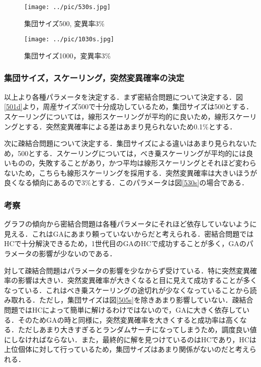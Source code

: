 \documentclass[a4j]{jarticle}
\begin{document}
\begin{figure}[H]
 \begin{minipage}{0.5\hsize}
  \begin{center}
   \texttt{[image: ../pic/530s.jpg]}
  \end{center}
  \caption{集団サイズ500, 変異率3\%}
  \label{530s}
 \end{minipage}
 \begin{minipage}{0.5\hsize}
  \begin{center}
   \texttt{[image: ../pic/1030s.jpg]}
  \end{center}
  \caption{集団サイズ1000，変異率3\%}
  \label{1030s}
 \end{minipage}
\end{figure}


\subsubsection{集団サイズ，スケーリング，突然変異確率の決定}
以上より各種パラメータを決定する．まず密結合問題について決定する．図\ref{501d}より，周産サイズ500で十分成功しているため，集団サイズは500とする．スケーリングについては，線形スケーリングが平均的に良いため，線形スケーリングとする．突然変異確率による差はあまり見られないため0.1\%とする．\par
次に疎結合問題について決定する．集団サイズによる違いはあまり見られないため，500とする．スケーリングについては，べき乗スケーリングが平均的には良いものの，失敗することがあり，かつ平均は線形スケーリングとそれほど変わらないため，こちらも線形スケーリングを採用する．突然変異確率は大きいほうが良くなる傾向にあるので3\%とする．このパラメータは図\ref{530s}の場合である．

\subsubsection{考察}
グラフの傾向から密結合問題は各種パラメータにそれほど依存していないように見える．これはGAにあまり頼っていないからだと考えられる．密結合問題ではHCで十分解決できるため，1世代目のGAのHCで成功することが多く，GAのパラメータの影響が少ないのである．\par
対して疎結合問題はパラメータの影響を少なからず受けている．特に突然変異確率の影響は大きい．突然変異確率が大きくなると目に見えて成功することが多くなっている．これはべき乗スケーリングの途切れが少なくなっていることから読み取れる．ただし，集団サイズは図\ref{505s}を除きあまり影響していない．疎結合問題ではHCによって簡単に解けるわけではないので，GAに大きく依存している．そのためGAの時と同様に，突然変異確率を大きくすると成功率は高くなる．ただしあまり大きすぎるとランダムサーチになってしまうため，調度良い値にしなければならない．また，最終的に解を見つけているのはHCであり，HCは上位個体に対して行っているため，集団サイズはあまり関係がないのだと考えられる．
\end{document}
